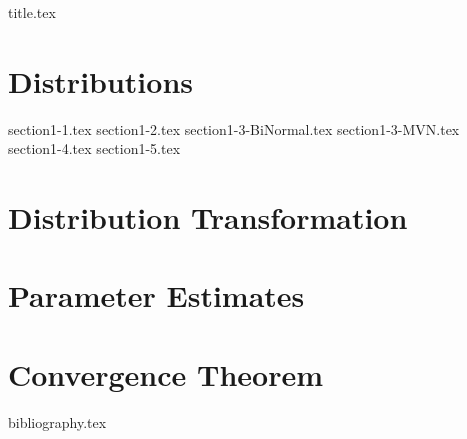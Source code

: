 \documentclass[a4paper,11pt]{book}
\theoremstyle{definition}
\theoremstyle{remark}
\begin{document}
\frontmatter
{title.tex}
\clearpage

\tableofcontents

\mainmatter

\chapter{Distributions}

{section1-1.tex}
\clearpage
{section1-2.tex}
\clearpage
{section1-3-BiNormal.tex}
\clearpage
{section1-3-MVN.tex}
\clearpage
{section1-4.tex}
\clearpage
{section1-5.tex}

\chapter{Distribution Transformation}


\chapter{Parameter Estimates}


\clearpage


\chapter{Convergence Theorem}


\clearpage


\backmatter

{bibliography.tex}
\end{document}

